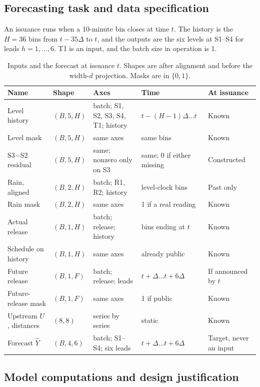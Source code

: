 \documentclass[11pt,a4paper]{article}
\begin{document}
\subsection{Forecasting task and data specification}

An issuance runs when a 10-minute bin closes at time \(t\). The history is the \(H=36\) bins from \(t-35\Delta\) to \(t\), and the outputs are the six levels at S1--S4 for leads \(h=1,\ldots,6\). T1 is an input, and the batch size in operation is 1.

\begin{table}[H]
\centering
\caption*{Inputs and the forecast at issuance \(t\). Shapes are after alignment and before the width-\(d\) projection. Masks are in \(\{0,1\}\).}
\footnotesize
\setlength{\tabcolsep}{3pt}
\begin{tabular}{llp{3.5cm}ll}
\toprule
Name & Shape & Axes & Time & At issuance \\
\midrule
Level history & \((B,5,H)\) & batch; S1, S2, S3, S4, T1; history & \(t-(H-1)\Delta\ldots t\) & Known \\
Level mask & \((B,5,H)\) & same axes & same bins & Known \\
S3\(-\)S2 residual & \((B,5,H)\) & same; nonzero only on S3 & same; 0 if either missing & Constructed \\
Rain, aligned & \((B,2,H)\) & batch; R1, R2; history & level-clock bins & Past only \\
Rain mask & \((B,2,H)\) & same axes & 1 if a real reading & Known \\
Actual release & \((B,1,H)\) & batch; release; history & bins ending at \(t\) & Known \\
Schedule on history & \((B,1,H)\) & same axes & already public & Known \\
Future release & \((B,1,F)\) & batch; release; leads & \(t+\Delta\ldots t+6\Delta\) & If announced by \(t\) \\
Future-release mask & \((B,1,F)\) & same axes & 1 if public & Known \\
Upstream \(U\), distances & \((8,8)\) & series by series & static & Known \\
Forecast \(\hat Y\) & \((B,4,6)\) & batch; S1--S4; six leads & \(t+\Delta\ldots t+6\Delta\) & Target, never an input \\
\bottomrule
\end{tabular}
\end{table}

\subsection{Model computations and design justification}
\end{document}

